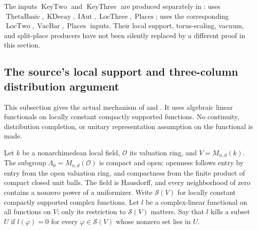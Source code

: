 The inputs \(\operatorname{KeyTwo}\) and
\(\operatorname{KeyThree}\) are produced separately in
:
 uses
\(\operatorname{ThetaBasic},\operatorname{KDecay},
\operatorname{IAut},\operatorname{LocThree},\operatorname{Places}\);
 uses the corresponding
\(\operatorname{LocTwo},\operatorname{VacBar},\operatorname{Places}\)
inputs. Their local support, torus-scaling, vacuum, and
split-place producers have not been silently replaced by
a different proof in this section.

\subsection{The source's local support and three-column distribution argument}
\label{subsec:sr-source-local-three}

This subsection gives the actual mechanism of
 and
.
It uses algebraic linear functionals on locally constant compactly
supported functions. No continuity, distribution completion, or
unitary representation assumption on the functional is made.

Let \(k\) be a nonarchimedean local field, \(\mathcal O\) its valuation
ring, and \(V=M_{n,d}(k)\).
The subgroup \(\Lambda_0=M_{n,d}(\mathcal O)\) is compact and open:
openness follows entry by entry from the open valuation ring, and
compactness from the finite product of compact closed unit balls.
The field is Hausdorff, and every neighborhood of zero contains a
nonzero power of a uniformizer.
Write \(\mathcal S(V)\) for locally constant compactly supported
complex functions.
Let \(l\) be a complex-linear functional on all functions on \(V\);
only its restriction to \(\mathcal S(V)\) matters.
Say that \(l\) kills a subset \(U\) if \(l(\varphi)=0\) for every
\(\varphi\in\mathcal S(V)\) whose nonzero set lies in \(U\).

